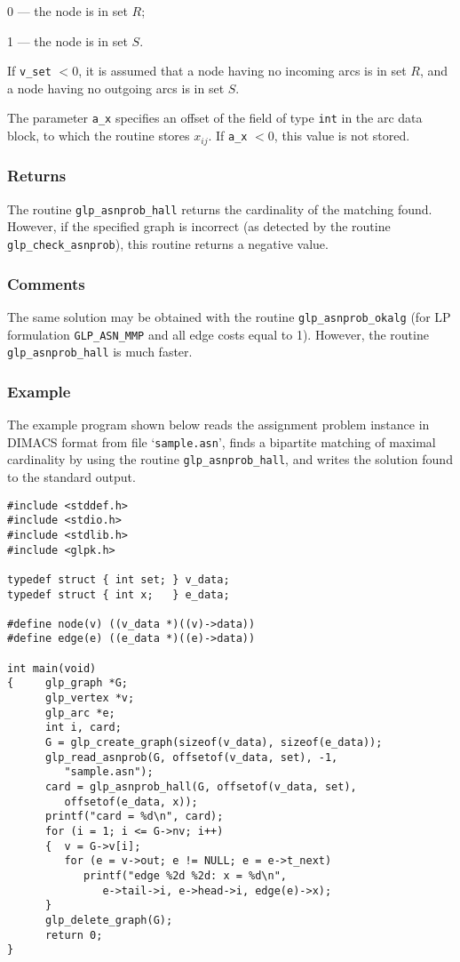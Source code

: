 0 --- the node is in set $R$;

1 --- the node is in set $S$.

\noindent
If \verb|v_set| $<0$, it is assumed that a node having no incoming arcs
is in set $R$, and a node having no outgoing arcs is in set $S$.

The parameter \verb|a_x| specifies an offset of the field of type
\verb|int| in the arc data block, to which the routine stores $x_{ij}$.
If \verb|a_x| $<0$, this value is not stored.

\subsubsection*{Returns}

The routine \verb|glp_asnprob_hall| returns the cardinality of the
matching found. However, if the specified graph is incorrect (as
detected by the routine \verb|glp_check_asnprob|), this routine returns
a negative value.

\subsubsection*{Comments}

The same solution may be obtained with the routine
\verb|glp_asnprob_okalg| (for LP formulation \verb|GLP_ASN_MMP| and
all edge costs equal to 1). However, the routine \verb|glp_asnprob_hall|
is much faster.

\newpage

\subsubsection*{Example}

The example program shown below reads the assignment problem instance
in DIMACS format from file `\verb|sample.asn|', finds a bipartite
matching of maximal cardinality by using the routine
\verb|glp_asnprob_hall|, and writes the solution found to the standard
output.

\begin{footnotesize}
\begin{verbatim}
#include <stddef.h>
#include <stdio.h>
#include <stdlib.h>
#include <glpk.h>

typedef struct { int set; } v_data;
typedef struct { int x;   } e_data;

#define node(v) ((v_data *)((v)->data))
#define edge(e) ((e_data *)((e)->data))

int main(void)
{     glp_graph *G;
      glp_vertex *v;
      glp_arc *e;
      int i, card;
      G = glp_create_graph(sizeof(v_data), sizeof(e_data));
      glp_read_asnprob(G, offsetof(v_data, set), -1,
         "sample.asn");
      card = glp_asnprob_hall(G, offsetof(v_data, set),
         offsetof(e_data, x));
      printf("card = %d\n", card);
      for (i = 1; i <= G->nv; i++)
      {  v = G->v[i];
         for (e = v->out; e != NULL; e = e->t_next)
            printf("edge %2d %2d: x = %d\n",
               e->tail->i, e->head->i, edge(e)->x);
      }
      glp_delete_graph(G);
      return 0;
}
\end{verbatim}
\end{footnotesize}

